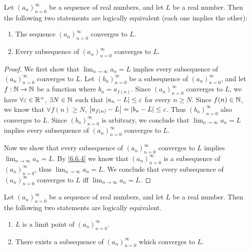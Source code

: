 \begin{prop}\label{6.6.5}
  Let \((a_n)_{n = 0}^\infty\) be a sequence of real numbers, and let \(L\) be a real number.
  Then the following two statements are logically equivalent (each one implies the other):
  \begin{enumerate}
    \item The sequence \((a_n)_{n = 0}^\infty\) converges to \(L\).
    \item Every subsequence of \((a_n)_{n = 0}^\infty\) converges to \(L\).
  \end{enumerate}
\end{prop}

\begin{proof}
  We first show that \(\lim_{n \to \infty} a_n = L\) implies every subsequence of \((a_n)_{n = 0}^\infty\) converges to \(L\).
  Let \((b_n)_{n = 0}^\infty\) be a subsequence of \((a_n)_{n = 0}^\infty\), and let \(f : \mathbb{N} \to \mathbb{N}\) be a function where \(b_n = a_{f(n)}\).
  Since \((a_n)_{n = 0}^\infty\) converges to \(L\), we have \(\forall \varepsilon \in \mathbb{R}^+\), \(\exists N \in \mathbb{N}\) such that \(\left\lvert a_n - L\right\rvert \leq \varepsilon\) for every \(n \geq N\).
  Since \(f(n) \in \mathbb{N}\), we know that \(\forall f(n) \geq N\), \(\left\lvert a_{f(n)} - L\right\rvert = \left\lvert b_n - L\right\rvert \leq \varepsilon\).
  Thus \((b_n)_{n = 0}^\infty\) also converges to \(L\).
  Since \((b_n)_{n = 0}^\infty\) is arbitrary, we conclude that \(\lim_{n \to \infty} a_n = L\) implies every subsequence of \((a_n)_{n = 0}^\infty\) converges to \(L\).

  Now we show that every subsequence of \((a_n)_{n = 0}^\infty\) converges to \(L\) implies \(\lim_{n \to \infty} a_n = L\).
  By \cref{6.6.4} we know that \((a_n)_{n = 0}^\infty\) is a subsequence of \((a_n)_{n = 0}^\infty\), thus \(\lim_{n \to \infty} a_n = L\).
  We conclude that every subsequence of \((a_n)_{n = 0}^\infty\) converges to \(L\) iff \(\lim_{n \to \infty} a_n = L\).
\end{proof}

\begin{prop}\label{6.6.6}
  Let \((a_n)_{n = 0}^\infty\) be a sequence of real numbers, and let \(L\) be a real number.
  Then the following two statements are logically equivalent.
  \begin{enumerate}
    \item \(L\) is a limit point of \((a_n)_{n = 0}^\infty\).
    \item There exists a subsequence of \((a_n)_{n = 0}^\infty\) which converges to \(L\).
  \end{enumerate}
\end{prop}

